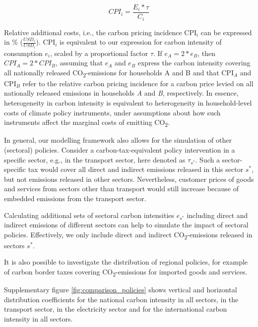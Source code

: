 \documentclass[12pt, a4paper]{article}
\begin{document}
\begin{refsection}
\begin{equation}
    CPI_{i} = \frac{E_{i}*\tau}{C_{i}}
\end{equation}

Relative additional costs, i.e., the carbon pricing incidence CPI$_{i}$ can be expressed in \% ($\frac{USD_{\tau}}{USD_{i}}$). CPI$_{i}$ is equivalent to our expression for carbon intensity of consumption $e_{i}$, scaled by a proportional factor $\tau$. If $e_{A}=2*e_{B}$, then $CPI_{A}=2*CPI_{B}$, assuming that $e_{A}$ and $e_{B}$ express the carbon intensity covering all nationally released CO\textsubscript{2}-emissions for households A and B and that CPI$_{A}$ and CPI$_{B}$ refer to the relative carbon pricing incidence for a carbon price levied on all nationally released emissions in households \textit{A} and \textit{B}, respectively. In essence, heterogeneity in carbon intensity is equivalent to heterogeneity in household-level costs of climate policy instruments, under assumptions about how such instruments affect the marginal costs of emitting CO\textsubscript{2}.

In general, our modelling framework also allows for the simulation of other (sectoral) policies. Consider a carbon-tax-equivalent policy intervention in a specific sector, e.g., in the transport sector, here denoted as $\tau_{s^{*}}$. Such a sector-specific tax would cover all direct and indirect emissions released in this sector $s^{*}$, but not emissions released in other sectors. Nevertheless, customer prices of goods and services from sectors other than transport would still increase because of embedded emissions from the transport sector.

Calculating additional sets of sectoral carbon intensities $e_{s^{*}}$ including direct and indirect emissions of different sectors can help to simulate the impact of sectoral policies. Effectively, we only include direct and indirect CO\textsubscript{2}-emissions released in sectors $s^{*}$.

It is also possible to investigate the distribution of regional policies, for example of carbon border taxes covering CO\textsubscript{2}-emissions for imported goods and services. 

Supplementary figure \ref{fig:comparison_policies} shows vertical and horizontal distribution coefficients for the national carbon intensity in all sectors, in the transport sector, in the electricity sector and for the international carbon intensity in all sectors. 

\clearpage


\end{refsection}
\end{document}
